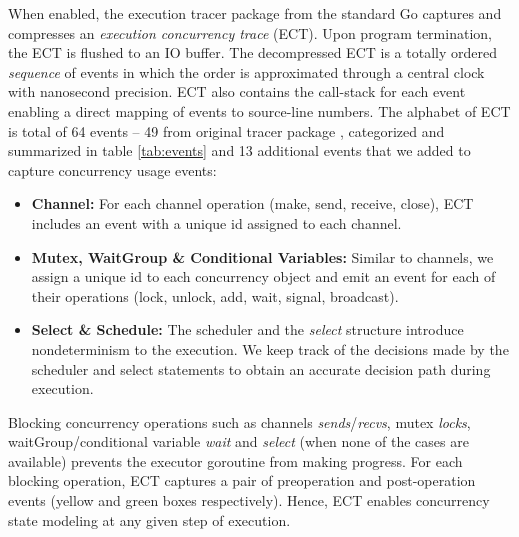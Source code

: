 When enabled, the execution tracer package from the standard Go captures and compresses an \textit{execution concurrency trace} (ECT).
%
Upon program termination, the ECT is flushed to an IO buffer.
%
The decompressed ECT is a totally ordered \textit{sequence} of events in which the order is approximated through a central clock with nanosecond precision.
%
ECT also contains the call-stack for each event enabling a direct mapping of events to source-line numbers.
%
The alphabet of ECT is total of 64 events -- 49 from original tracer package \cite{goParserSource}, categorized and summarized in table \ref{tab:events} and 13 additional events that we added to capture concurrency usage events:
%
\begin{itemize}
    \item \textbf{Channel:} For each channel operation (make, send, receive, close), ECT includes an event with a unique id assigned to each channel.
    \item \textbf{Mutex, WaitGroup \& Conditional Variables:} Similar to channels, we assign a unique id to each concurrency object and emit an event for each of their operations (lock, unlock, add, wait, signal, broadcast).
    \item \textbf{Select \& Schedule:} The scheduler and the \textit{select} structure introduce nondeterminism to the execution. We keep track of the decisions made by the scheduler and select statements to obtain an accurate decision path during execution.
\end{itemize}

Blocking concurrency operations such as channels \textit{sends}/\textit{recvs}, mutex \textit{locks}, waitGroup/conditional variable \textit{wait} and \textit{select} (when none of the cases are available) prevents the executor goroutine from making progress.
%
For each blocking operation, ECT captures a pair of preoperation and post-operation events (yellow and green boxes respectively).
%
Hence, ECT enables concurrency state modeling at any given step of execution.
%

